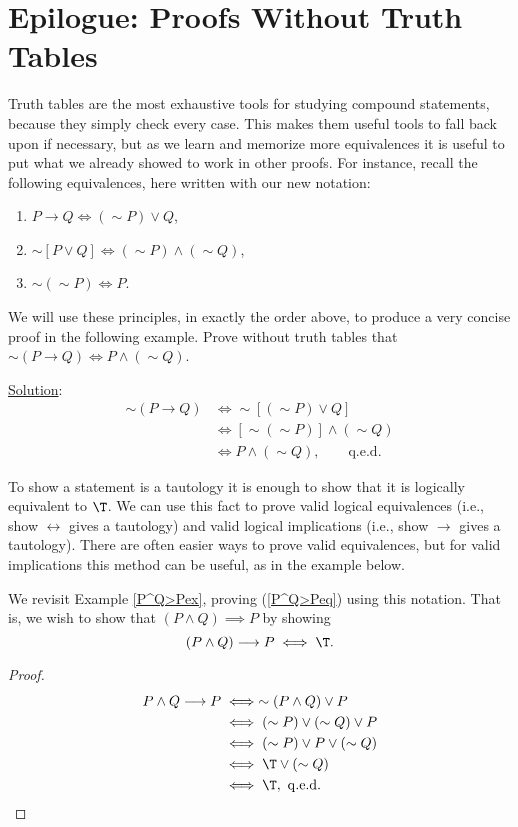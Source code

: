 \section{Epilogue: Proofs Without Truth Tables}

Truth tables are the most exhaustive tools for studying
compound statements, because they simply check every case.
This makes them useful tools to fall back upon if necessary,
but as we learn and memorize more equivalences
it is useful to put what we already showed to work in other proofs.
For instance, recall the following equivalences, here written
with our new notation:
\begin{enumerate}
\item $P\longrightarrow Q\iff(\sim P)\vee Q$,
\item $\sim[P\vee Q]\iff(\sim P)\wedge(\sim Q)$,
\item $\sim(\sim P)\iff P$.
\end{enumerate}
We will use these principles, in exactly the  order above, to
produce a very concise proof in the following example.
\bex Prove without truth tables that $\sim(P\longrightarrow Q)
\iff P\wedge(\sim Q)$.

\underline{Solution}:
\begin{align*}
\sim(P\longrightarrow Q)&\iff\sim[(\sim P)\vee Q]\\  
                        &\iff[\sim(\sim P)]\wedge(\sim Q)\\
                        &\iff P\wedge(\sim Q),\qquad\text{q.e.d.}
\end{align*}
\eex



To show a statement is a tautology it is enough to show that
it is logically equivalent to $\T$.  We can use this 
fact to prove valid logical equivalences (i.e., show
$\longleftrightarrow$ gives a tautology) and 
valid logical implications (i.e., show $\longrightarrow$
gives a tautology).  There are often easier ways to 
prove valid equivalences, but for valid implications this 
method can be useful, as in the example below.

\bex We revisit Example \ref{P^Q>Pex}, proving
(\ref{P^Q>Peq}) using  this notation.  That is, we wish
 to show that $(P\wedge Q)\implies P$ by showing
$$(P\wedge Q)\longrightarrow P\iff\T.$$ 

\begin{proof}\begin{align*}
P\wedge Q\longrightarrow P&\iff\sim(P\wedge Q)\vee P\\
&\iff(\sim P)\vee(\sim Q)\vee P\\
&\iff(\sim P)\vee P\vee(\sim Q)\\
&\iff \T\vee(\sim Q)\\
&\iff \T,\ {\rm q.e.d.}\end{align*}
\end{proof}\eex\bigskip


